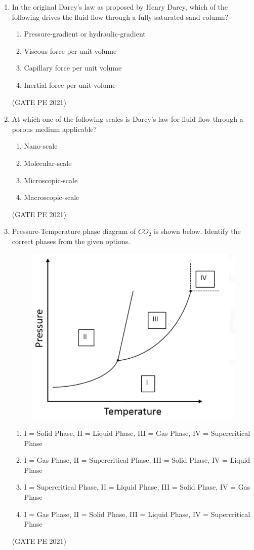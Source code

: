 \documentclass[journal,12pt,onecolumn]{IEEEtran}
\theoremstyle{remark}
\begin{document}
\begin{enumerate}
\item In the original Darcy's law as proposed by Henry Darcy, which of the following drives the fluid flow through a fully saturated sand column?
\begin{enumerate}
    \item Pressure-gradient or hydraulic-gradient
    \item Viscous force per unit volume
    \item Capillary force per unit volume
    \item Inertial force per unit volume
\end{enumerate}
\hfill{(GATE PE 2021)}

\item At which one of the following scales is Darcy's law for fluid flow through a porous medium applicable?
\begin{enumerate}
    \item Nano-scale
    \item Molecular-scale
    \item Microscopic-scale
    \item Macroscopic-scale
\end{enumerate}
\hfill{(GATE PE 2021)}

\item Pressure-Temperature phase diagram of $CO_2$ is shown below. Identify the correct phases from the given options.
\begin{figure}[h]
    \centering
    \includegraphics[width=0.5\columnwidth]{Q_11.png}
    \caption{}
    \label{fig:placeholder}
\end{figure}
\begin{enumerate}
    \item I = Solid Phase, II = Liquid Phase, III = Gas Phase, IV = Supercritical Phase
    \item I = Gas Phase, II = Supercritical Phase, III = Solid Phase, IV = Liquid Phase
    \item I = Supercritical Phase, II = Liquid Phase, III = Solid Phase, IV = Gas Phase
    \item I = Gas Phase, II = Solid Phase, III = Liquid Phase, IV = Supercritical Phase
\end{enumerate}
\hfill{(GATE PE 2021)}


\end{enumerate}
\end{document}
